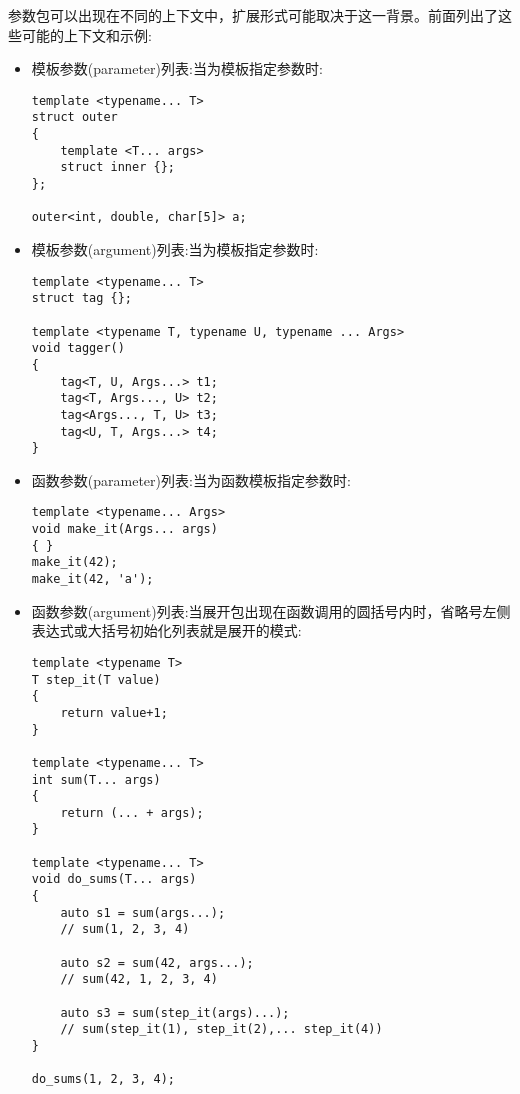 
参数包可以出现在不同的上下文中，扩展形式可能取决于这一背景。前面列出了这些可能的上下文和示例:

\begin{itemize}
\item
模板参数(parameter)列表:当为模板指定参数时:

\begin{lstlisting}[style=styleCXX]
template <typename... T>
struct outer
{
	template <T... args>
	struct inner {};
};

outer<int, double, char[5]> a;
\end{lstlisting}

\item
模板参数(argument)列表:当为模板指定参数时:

\begin{lstlisting}[style=styleCXX]
template <typename... T>
struct tag {};

template <typename T, typename U, typename ... Args>
void tagger()
{
	tag<T, U, Args...> t1;
	tag<T, Args..., U> t2;
	tag<Args..., T, U> t3;
	tag<U, T, Args...> t4;
}
\end{lstlisting}

\item
函数参数(parameter)列表:当为函数模板指定参数时:

\begin{lstlisting}[style=styleCXX]
template <typename... Args>
void make_it(Args... args)
{ }
make_it(42);
make_it(42, 'a');
\end{lstlisting}

\item
函数参数(argument)列表:当展开包出现在函数调用的圆括号内时，省略号左侧表达式或大括号初始化列表就是展开的模式:

\begin{lstlisting}[style=styleCXX]
template <typename T>
T step_it(T value)
{
	return value+1;
}

template <typename... T>
int sum(T... args)
{
	return (... + args);
}

template <typename... T>
void do_sums(T... args)
{
	auto s1 = sum(args...);
	// sum(1, 2, 3, 4)
	
	auto s2 = sum(42, args...);
	// sum(42, 1, 2, 3, 4)
	
	auto s3 = sum(step_it(args)...);
	// sum(step_it(1), step_it(2),... step_it(4))
}

do_sums(1, 2, 3, 4);
\end{lstlisting}


\end{itemize}
